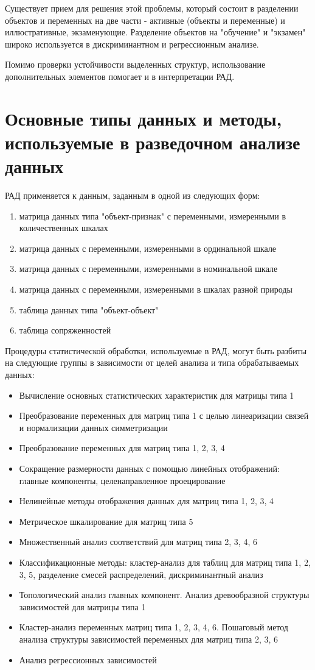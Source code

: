 \documentclass[a4paper, 12pt]{article}
\begin{document}
Существует прием для решения этой проблемы, который состоит в разделении объектов и переменных на две части - активные (объекты и переменные) и иллюстративные, экзаменующие. Разделение объектов на "обучение" и "экзамен" широко используется в дискриминантном и регрессионным анализе. 

Помимо проверки устойчивости выделенных структур, использование дополнительных элементов помогает и в интерпретации РАД.

\section{Основные типы данных и методы, используемые в разведочном анализе данных}

РАД применяется к данным, заданным в одной из следующих форм:
\begin{enumerate}
	\item матрица данных типа "объект-признак" с переменными, измеренными в количественных шкалах
	\item матрица данных с переменными, измеренными в ординальной шкале
	\item матрица данных с переменными, измеренными в номинальной шкале
	\item матрица данных с переменными, измеренными в шкалах разной природы
	\item таблица данных типа "объект-объект"
	\item таблица сопряженностей
\end{enumerate}

Процедуры статистической обработки, используемые в РАД, могут быть разбиты на следующие группы в зависимости от целей анализа и типа обрабатываемых данных:
\begin{itemize}
	\item Вычисление основных статистических характеристик для матрицы типа 1
	\item Преобразование переменных для матриц типа 1 с целью линеаризации связей и нормализации данных симметризации
	\item Преобразование переменных для матриц типа 1, 2, 3, 4
	\item Сокращение размерности данных с помощью линейных отображений: главные компоненты, целенаправленное проецирование
	\item Нелинейные методы отображения данных для матриц типа 1, 2, 3, 4
	\item Метрическое шкалирование для матриц типа 5
	\item Множественный анализ соответствий для матриц типа 2, 3, 4, 6
	\item Классификационные методы: кластер-анализ для таблиц для матриц типа 1, 2, 3, 5, разделение смесей распределений, дискриминантный анализ
	\item Топологический анализ главных компонент. Анализ древообразной структуры зависимостей для матрицы типа 1
	\item Кластер-анализ переменных матриц типа 1, 2, 3, 4, 6. Пошаговый метод анализа структуры зависимостей переменных для матриц типа 2, 3, 6
	\item Анализ регрессионных зависимостей
\end{itemize}
\end{document}
